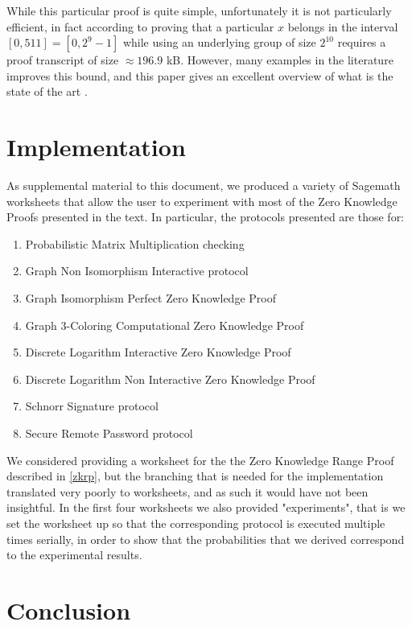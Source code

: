 \documentclass{article}
\begin{document}
While this particular proof is quite simple, unfortunately it is not particularly efficient, in fact according to \cite{boudotEfficientProofsThat2000}
proving that a particular $x$ belongs in the interval $[0, 511] = [0, 2^9 -1]$ while using an underlying group of size $2^{10}$ requires a proof 
transcript of size $\approx 196.9$ kB. However, many examples in the literature improves this bound, and this paper gives 
an excellent overview of what is the state of the art \cite{moraisSurveyZeroKnowledge2019}.

\section{Implementation}
As supplemental material to this document, we produced a variety of Sagemath worksheets that allow the user to experiment 
with most of the Zero Knowledge Proofs presented in the text. In particular, the protocols presented are those for:
\begin{enumerate}
    \item Probabilistic Matrix Multiplication checking
    \item Graph Non Isomorphism Interactive protocol
    \item Graph Isomorphism Perfect Zero Knowledge Proof
    \item Graph 3-Coloring Computational Zero Knowledge Proof
    \item Discrete Logarithm Interactive Zero Knowledge Proof
    \item Discrete Logarithm Non Interactive Zero Knowledge Proof
    \item Schnorr Signature protocol
    \item Secure Remote Password protocol
\end{enumerate}

We considered providing a worksheet for the the Zero Knowledge Range Proof described in \ref{zkrp}, but the branching that 
is needed for the implementation translated very poorly to worksheets, and as such it would have not been insightful.
In the first four worksheets we also provided "experiments", that is we set the worksheet up so that the corresponding 
protocol is executed multiple times serially, in order to show that the probabilities that we derived correspond to 
the experimental results. 

\section{Conclusion}
\end{document}
